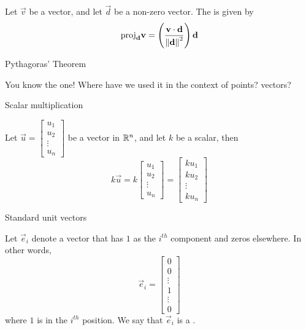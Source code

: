 \documentclass{ximera}
\begin{document}
\begin{expandable}
    Let $\vec{v}$ be a vector, and let $\vec{d}$ be a non-zero vector.  The  is given by 
$$\mbox{proj}_{\mathbf{d}}\mathbf{v}=\left(\frac{\mathbf{v}\cdot\mathbf{d}}{\left\lVert\mathbf{d}\right\rVert^2}\right)\mathbf{d}$$
\end{expandable}


Pythagoras’ Theorem
\begin{expandable}
    You know the one!  Where have we used it in the context of points? vectors?
\end{expandable}


Scalar multiplication 

\begin{expandable}
    Let $\vec{u}=\begin{bmatrix}
u_1\\
u_2\\
\vdots\\
u_n
\end{bmatrix}$ be a vector in $\mathbb{R}^n$, and let $k$ be a scalar, then
  $$k\vec{u}=k\begin{bmatrix}
u_1\\
u_2\\
\vdots\\
u_n
\end{bmatrix}=\begin{bmatrix}
ku_1\\
ku_2\\
\vdots\\
ku_n
\end{bmatrix}$$
\end{expandable}


Standard unit vectors

\begin{expandable}
  Let $\vec{e}_i$ denote a vector that has $1$ as the $i^{th}$ component and zeros elsewhere.  In other words, $$\vec{e}_i=\begin{bmatrix}
0\\
0\\
\vdots\\
1\\
\vdots\\
0
\end{bmatrix}$$ 
  where $1$ is in the $i^{th}$ position.  We say that  $\vec{e}_i$ is a .
\end{expandable}
\end{document}
